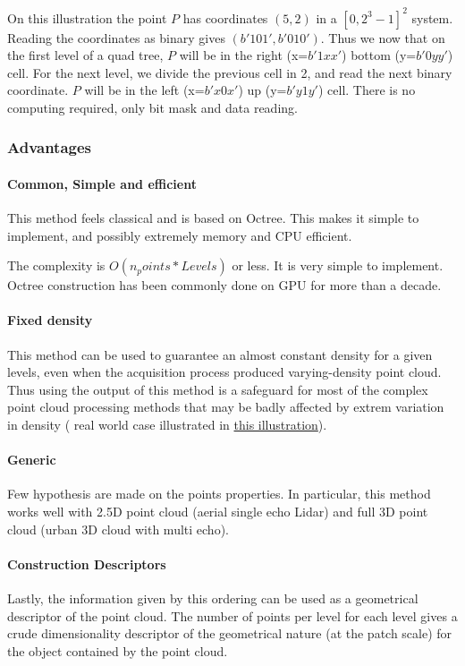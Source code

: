 				 On this illustration the point $P$ has coordinates $(5,2)$ in a $[0,2^3-1]^2$ system. Reading the coordinates as binary gives $(b'101',b'010')$.
				 Thus we now that on the first level of a quad tree, $P$ will be in the right (x=$b'1xx'$) bottom (y=$b'0yy'$) cell.
				 For the next level, we divide the previous cell in 2, and read the next binary coordinate. $P$ will be in the left (x=$b'x0x'$) up (y=$b'y1y'$) cell. There is no computing required, only bit mask and data reading.
			
		\subsubsection{Advantages}	
		
			\paragraph{Common, Simple and efficient}
				This method feels classical and is based on Octree. This makes it simple to implement, and possibly extremely memory and CPU efficient.

				The complexity is $O(n_points*Levels)$ or less. It is very simple to implement.				
				Octree construction has been commonly done on GPU for more than a decade.
				
			\paragraph{Fixed density}
				This method can be used to guarantee an almost constant density for a given levels, even when the acquisition process produced varying-density point cloud.
				Thus using the output of this method is a safeguard for most of the complex point cloud processing methods that may be badly affected by extrem variation in density ( real world case illustrated in \href{fig:density-variation}{this illustration}).
			\paragraph{Generic}
				Few hypothesis are made on the points properties. In particular, this method works well with 2.5D point cloud (aerial single echo Lidar) and full 3D point cloud (urban 3D cloud with multi echo).
			\paragraph{Construction Descriptors}
				Lastly, the information given by this ordering can be used as a  geometrical descriptor of the point cloud.
				The number of points per level for each level gives a crude dimensionality descriptor of the geometrical nature (at the patch scale) for the object contained by the point cloud.
				
